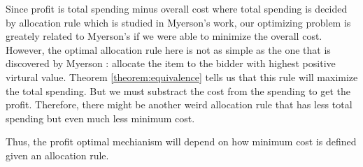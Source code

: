 Since profit is total spending minus overall cost where total spending is
decided by allocation rule which is studied in Myerson's work, our optimizing
problem is greately related to Myerson's if we were able to minimize the
overall cost. However, the optimal allocation rule here is not as simple as the
one that is discovered by Myerson \cite{Myerson:1981}: allocate the item to the
bidder with highest positive virtural value.  Theorem \ref{theorem:equivalence}
tells us that this rule will maximize the total spending.  But we must
substract the cost from the spending to get the profit.  Therefore, there might
be another weird allocation rule that has less total spending but even much
less minimum cost.


Thus, the profit optimal mechianism will depend on how minimum cost is defined given an allocation rule. 


